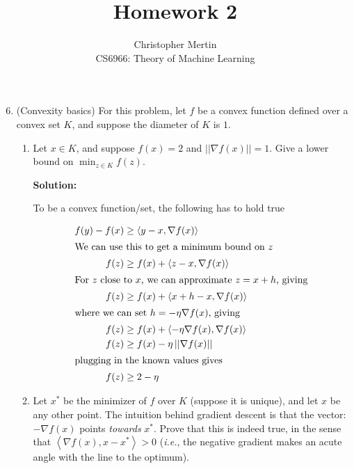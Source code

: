 \documentclass[12pt]{article}
\newcommand{\norm}[1]{\left|\left| #1 \right|\right|}
\newcommand{\inner}[2]{\left< #1 , #2\right>}
\newcommand{\grad}{\nabla}
\begin{document}
 
 
\title{Homework 2}%
\author{Christopher Mertin\\ %
CS6966: Theory of Machine Learning} %
 
\maketitle

\begin{enumerate}
  \setcounter{enumi}{5}
\item (Convexity basics) For this problem, let $f$ be a convex function defined over a convex set $K$, and suppose the diameter of $K$ is $1$.
  \begin{enumerate}
    \item Let $x \in K$, and suppose $f(x) = 2$ and $\norm{\nabla f(x)} = 1$. Give a lower bound on $\min_{z\in K}f(z)$.

      {\bf Solution:}

      To be a convex function/set, the following has to hold true

      \begin{align*}
        f(y) - f(x) &\geq \inner{y - x}{\grad f(x)}\\
        \intertext{We can use this to get a minimum bound on $z$}
        f(z) &\geq f(x) + \inner{ z - x}{\grad f(x)}\\
        \intertext{For $z$ close to $x$, we can approximate $z = x + h$, giving}
        f(z) &\geq f(x) + \inner{ x + h - x}{\grad f(x)}\\
        \intertext{where we can set $h = -\eta \grad f(x)$, giving}
        f(z) &\geq f(x) + \inner{ -\eta\grad f(x)}{\grad f(x)}\\
        f(z) &\geq f(x) - \eta \norm{\grad f(x)}\\
        \intertext{plugging in the known values gives}
        f(z) &\geq 2 - \eta
        \end{align*}
      
    \item Let $x^{*}$ be the minimizer of $f$ over $K$ (suppose it is unique), and let $x$ be any other point. The intuition behind gradient descent is that the vector: $-\nabla f(x)$ points {\em towards} $x^{*}$. Prove that this is indeed true, in the sense that $\inner{\nabla f(x)}{x - x^{*}} > 0$ ({\em i.e.}, the negative gradient makes an acute angle with the line to the optimum).


\end{enumerate}
\end{enumerate}
\end{document}
